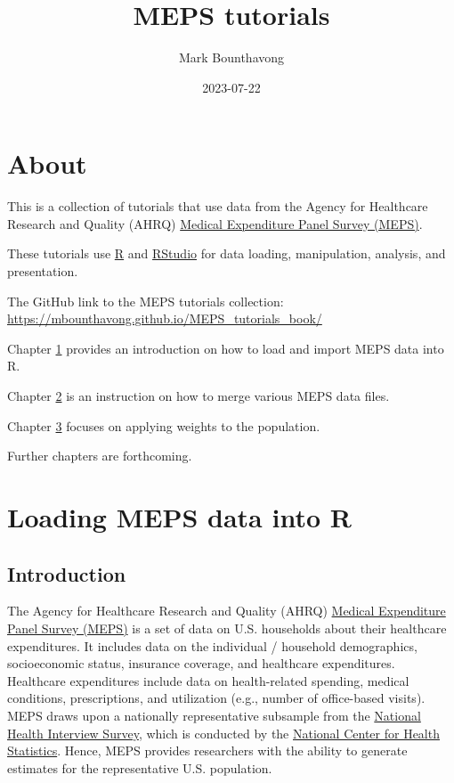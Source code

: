 \documentclass[
]{book}
\title{MEPS tutorials}
\author{Mark Bounthavong}
\date{2023-07-22}
\theoremstyle{definition}
\theoremstyle{definition}
\theoremstyle{definition}
\theoremstyle{definition}
\theoremstyle{remark}
\begin{document}
\maketitle

{
\setcounter{tocdepth}{1}
\tableofcontents
}
\hypertarget{about}{%
\chapter*{About}\label{about}}

This is a collection of tutorials that use data from the Agency for Healthcare Research and Quality (AHRQ) \href{https://meps.ahrq.gov/mepsweb/}{Medical Expenditure Panel Survey (MEPS)}.

These tutorials use \href{https://cran.r-project.org/}{R} and \href{https://posit.co/products/open-source/rstudio/}{RStudio} for data loading, manipulation, analysis, and presentation.

The GitHub link to the MEPS tutorials collection: \url{https://mbounthavong.github.io/MEPS_tutorials_book/}

Chapter \protect\hyperlink{intro}{1} provides an introduction on how to load and import MEPS data into R.

Chapter \protect\hyperlink{merging}{2} is an instruction on how to merge various MEPS data files.

Chapter \protect\hyperlink{weights}{3} focuses on applying weights to the population.

Further chapters are forthcoming.

\hypertarget{intro}{%
\chapter{Loading MEPS data into R}\label{intro}}

\hypertarget{introduction}{%
\section{Introduction}\label{introduction}}

The Agency for Healthcare Research and Quality (AHRQ) \href{https://www.meps.ahrq.gov/mepsweb/}{Medical Expenditure Panel Survey (MEPS)} is a set of data on U.S. households about their healthcare expenditures. It includes data on the individual / household demographics, socioeconomic status, insurance coverage, and healthcare expenditures. Healthcare expenditures include data on health-related spending, medical conditions, prescriptions, and utilization (e.g., number of office-based visits). MEPS draws upon a nationally representative subsample from the \href{https://www.cdc.gov/nchs/nhis/index.htm?CDC_AA_refVal=https\%3A\%2F\%2Fwww.cdc.gov\%2Fnchs\%2Fnhis.htm}{National Health Interview Survey}, which is conducted by the \href{https://www.cdc.gov/nchs/index.htm}{National Center for Health Statistics}. Hence, MEPS provides researchers with the ability to generate estimates for the representative U.S. population.
\end{document}
